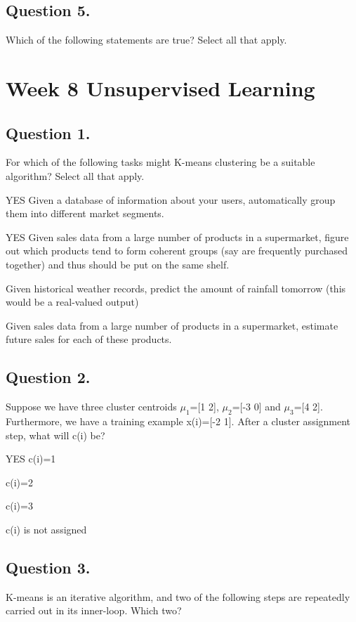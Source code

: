 \documentclass[11pt]{article} %
\begin{document}
\subsection*{Question 5. }
Which of the following statements are true? Select all that apply.



\newpage

\section{Week 8 Unsupervised Learning}

\subsection{ Question 1. } 
For which of the following tasks might K-means clustering be a suitable algorithm? Select all that apply.

YES Given a database of information about your users, automatically group them into different market segments.

YES Given sales data from a large number of products in a supermarket, figure out which products tend to form coherent groups (say are frequently purchased together) and thus should be put on the same shelf.

Given historical weather records, predict the amount of rainfall tomorrow (this would be a real-valued output)

Given sales data from a large number of products in a supermarket, estimate future sales for each of these products.
\subsection{ Question 2. }
Suppose we have three cluster centroids $\mu_1$=[1 2], $\mu_2$=[-3 0] and $\mu_3$=[4 2]. 
Furthermore, we have a training example x(i)=[-2 1]. After a cluster assignment step, what will c(i) be?

YES c(i)=1

c(i)=2

c(i)=3

c(i) is not assigned


\subsection{ Question 3. }
K-means is an iterative algorithm, and two of the following steps are repeatedly carried out in its inner-loop. Which two?
\end{document}
